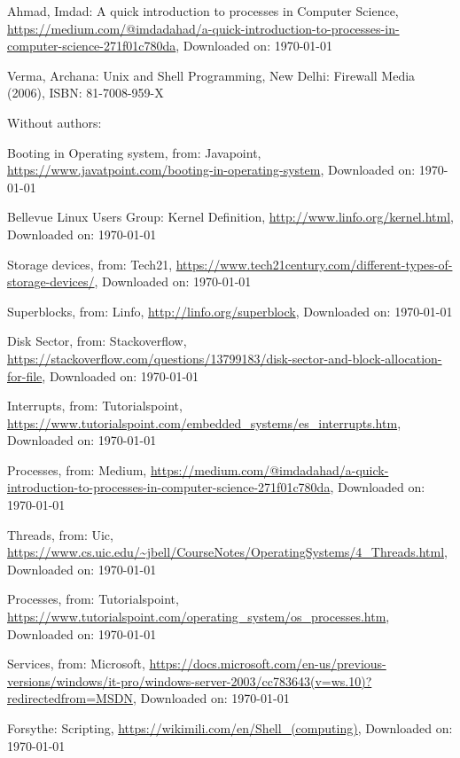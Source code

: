 \begin{thebibliography}{10}

	Ahmad, Imdad: A quick introduction to processes in Computer Science,
	\url{https://medium.com/@imdadahad/a-quick-introduction-to-processes-in-computer-science-271f01c780da},
	Downloaded on: \today

	Verma, Archana: Unix and Shell Programming,
	New Delhi: Firewall Media (2006),
	ISBN: 81-7008-959-X



Without authors:

	Booting in Operating system, from: Javapoint,
	\url{https://www.javatpoint.com/booting-in-operating-system},
	Downloaded on: \today

	Bellevue Linux Users Group: Kernel Definition,
	\url{http://www.linfo.org/kernel.html},
	Downloaded on: \today

	Storage devices, from: Tech21,
	\url{https://www.tech21century.com/different-types-of-storage-devices/},
	Downloaded on: \today

	Superblocks, from: Linfo,
	\url{http://linfo.org/superblock},
	Downloaded on: \today

	Disk Sector, from: Stackoverflow,
	\url{https://stackoverflow.com/questions/13799183/disk-sector-and-block-allocation-for-file},
	Downloaded on: \today

	Interrupts, from: Tutorialspoint,
	\url{https://www.tutorialspoint.com/embedded_systems/es_interrupts.htm},
	Downloaded on: \today

	Processes, from: Medium,
	\url{https://medium.com/@imdadahad/a-quick-introduction-to-processes-in-computer-science-271f01c780da},
	Downloaded on: \today

	Threads, from: Uic,
	\url{https://www.cs.uic.edu/~jbell/CourseNotes/OperatingSystems/4_Threads.html},
	Downloaded on: \today

	Processes, from: Tutorialspoint,
	\url{https://www.tutorialspoint.com/operating_system/os_processes.htm},
	Downloaded on: \today

	Services, from: Microsoft,
	\url{https://docs.microsoft.com/en-us/previous-versions/windows/it-pro/windows-server-2003/cc783643(v=ws.10)?redirectedfrom=MSDN},
	Downloaded on: \today

	Forsythe: Scripting,
	\url{https://wikimili.com/en/Shell_(computing)},
	Downloaded on: \today


\end{thebibliography}

